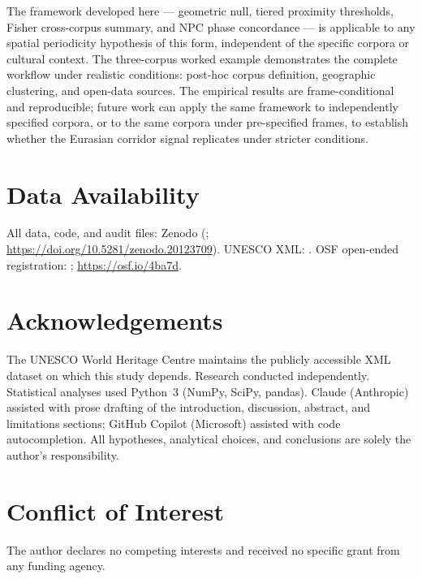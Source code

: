 \documentclass[12pt,a4paper]{article}
\begin{document}
The framework developed here --- geometric null, tiered proximity
thresholds, Fisher cross-corpus summary, and NPC phase concordance ---
is applicable to any spatial periodicity hypothesis of this form,
independent of the specific corpora or cultural context. The three-corpus
worked example demonstrates the complete workflow under realistic
conditions: post-hoc corpus definition, geographic clustering, and
open-data sources. The empirical results are frame-conditional and
reproducible; future work can apply the same framework to
independently specified corpora, or to the same corpora under
pre-specified frames, to establish whether the Eurasian corridor signal
replicates under stricter conditions.

\section*{Data Availability}
All data, code, and audit files: Zenodo (\citealt{tenenbaum2026audit};
\url{https://doi.org/10.5281/zenodo.20123709}).
UNESCO XML: \citealt{unescowhc2024xml}.
OSF open-ended registration: \citealt{tenenbaum2026prereg};
\url{https://osf.io/4ba7d}.

\section*{Acknowledgements}
The UNESCO World Heritage Centre maintains the publicly accessible XML
dataset on which this study depends. Research conducted independently.
Statistical analyses used Python~3 (NumPy, SciPy, pandas). Claude
(Anthropic) assisted with prose drafting of the introduction,
discussion, abstract, and limitations sections; GitHub Copilot
(Microsoft) assisted with code autocompletion. All hypotheses,
analytical choices, and conclusions are solely the author's
responsibility.

\section*{Conflict of Interest}
The author declares no competing interests and received no specific
grant from any funding agency.
\end{document}
